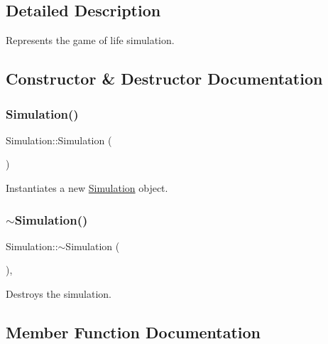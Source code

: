 \subsection{Detailed Description}
Represents the game of life simulation. 



\subsection{Constructor \& Destructor Documentation}
\mbox{\label{class_simulation_a5b224cc5b36bcc8eb29689aff223de41}} 
\subsubsection{\texorpdfstring{Simulation()}{Simulation()}}
{\footnotesize\ttfamily Simulation\+::\+Simulation (\begin{DoxyParamCaption}{ }\end{DoxyParamCaption})}



Instantiates a new \mbox{\hyperlink{class_simulation}{Simulation}} object. 

\mbox{\label{class_simulation_a70bcf076c771e7f87accb5194a29c2de}} 
\subsubsection{\texorpdfstring{$\sim$Simulation()}{~Simulation()}}
{\footnotesize\ttfamily Simulation\+::$\sim$\+Simulation (\begin{DoxyParamCaption}{ }\end{DoxyParamCaption})\hspace{0.3cm}{\ttfamily [override]}, {\ttfamily [virtual]}}



Destroys the simulation. 



\subsection{Member Function Documentation}
\mbox{\label{class_simulation_a73e3f1767b8503fa4d0608ec49e797bd}} 
